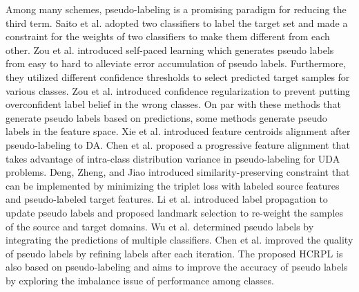 \documentclass[a4paper,fleqn]{cas-dc}
\begin{document}
	Among many schemes, pseudo-labeling is a promising paradigm for reducing the third term. Saito et al. \cite{saito2017asymmetric} adopted two classifiers to label the target set and made a constraint for the weights of two classifiers to make them different from each other. Zou et al. \cite{zou2018domain} introduced self-paced learning which generates pseudo labels from easy to hard to alleviate error accumulation of pseudo labels. Furthermore,  they utilized different confidence thresholds to select predicted target samples for various classes. Zou et al. \cite{zou2019confidence} introduced confidence regularization to prevent putting overconfident label belief in the wrong classes. On par with these methods that generate pseudo labels based on predictions, some methods generate pseudo labels in the feature space. Xie et al. \cite{xie2018learning} introduced feature centroids alignment after pseudo-labeling to DA. Chen et al. \cite{chen2019progressive} proposed a progressive feature alignment that takes advantage of intra-class distribution variance in pseudo-labeling for UDA problems.  Deng, Zheng, and Jiao \cite{DBLP:journals/corr/abs-1812-00893} introduced similarity-preserving constraint that can be implemented by minimizing the triplet loss with labeled source features and pseudo-labeled target features. Li et al. \cite{li2019locality} introduced label propagation to update pseudo labels and proposed landmark selection to re-weight the samples of the source and target domains. Wu et al. \cite{Wu2020IterativeRF} determined pseudo labels by integrating the predictions of multiple classifiers. Chen et al.  \cite{Chen2020DomainAB} improved the quality of pseudo labels by refining labels after each iteration. The proposed HCRPL is also based on pseudo-labeling and aims to improve the accuracy of pseudo labels by exploring the imbalance issue of performance among classes.
	
	
\end{document}
